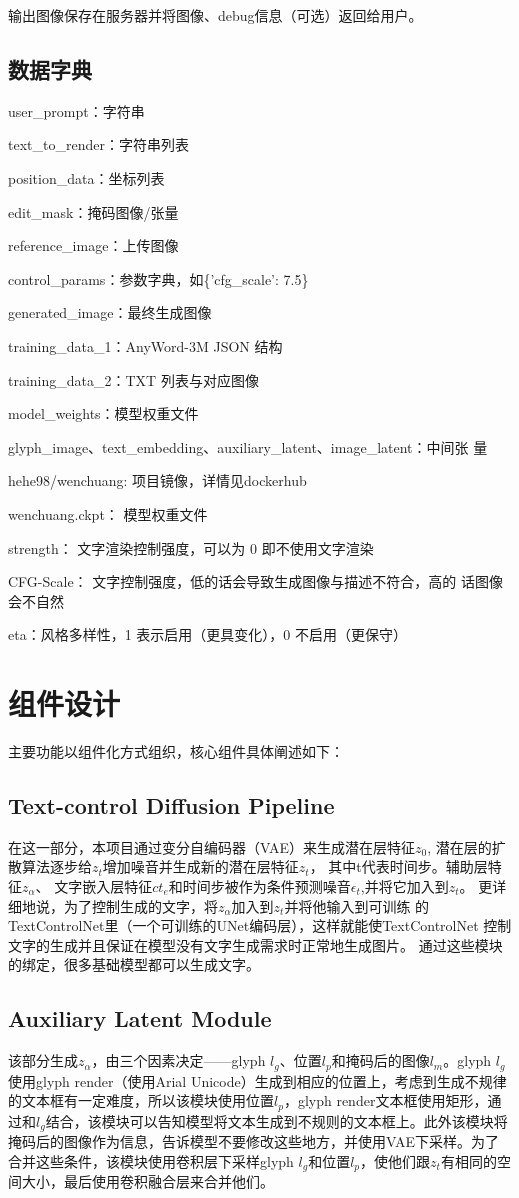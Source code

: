 \documentclass[a4paper,12pt]{ctexart}  %
\begin{document}
输出图像保存在服务器并将图像、debug信息（可选）返回给用户。
\subsection{数据字典}
user\_prompt：字符串

text\_to\_render：字符串列表

position\_data：坐标列表

edit\_mask：掩码图像/张量

reference\_image：上传图像

control\_params：参数字典，如\{'cfg\_scale': 7.5\}

generated\_image：最终生成图像

training\_data\_1：AnyWord-3M JSON 结构

training\_data\_2：TXT 列表与对应图像

model\_weights：模型权重文件

glyph\_image、text\_embedding、auxiliary\_latent、image\_latent：中间张
量

hehe98/wenchuang: 项目镜像，详情见dockerhub

wenchuang.ckpt： 模型权重文件

strength： 文字渲染控制强度，可以为 0 即不使用文字渲染

CFG-Scale： 文字控制强度，低的话会导致生成图像与描述不符合，高的
话图像会不自然

eta：风格多样性，1 表示启用（更具变化），0 不启用（更保守）

\section{组件设计}
主要功能以组件化方式组织，核心组件具体阐述如下：
\subsection{Text-control Diffusion Pipeline}
在这一部分，本项目通过变分自编码器（VAE）来生成潜在层特征$z_0$,
潜在层的扩散算法逐步给$z_t$增加噪音并生成新的潜在层特征$z_t$，
其中t代表时间步。辅助层特征$z_\alpha$、
文字嵌入层特征$ct_e$和时间步被作为条件预测噪音$\epsilon_t$,并将它加入到$z_t$。
更详细地说，为了控制生成的文字，将$z_\alpha$加入到$z_t$并将他输入到可训练
的TextControlNet里（一个可训练的UNet编码层），这样就能使TextControlNet
控制文字的生成并且保证在模型没有文字生成需求时正常地生成图片。
通过这些模块的绑定，很多基础模型都可以生成文字。
\subsection{Auxiliary Latent Module}
该部分生成$z_\alpha$，由三个因素决定——glyph $l_g$、位置$l_p$和掩码后的图像$l_m$。glyph $l_g$使用glyph render（使用Arial Unicode）生成到相应的位置上，考虑到生成不规律的文本框有一定难度，所以该模块使用位置$l_p$，glyph render文本框使用矩形，通过和$l_g$结合，该模块可以告知模型将文本生成到不规则的文本框上。此外该模块将掩码后的图像作为信息，告诉模型不要修改这些地方，并使用VAE下采样。为了合并这些条件，该模块使用卷积层下采样glyph $l_g$和位置$l_p$，使他们跟$z_t$有相同的空间大小，最后使用卷积融合层来合并他们。
\end{document}
